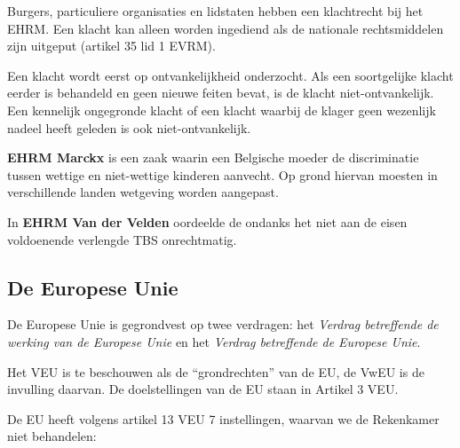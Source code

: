 \documentclass{article}
\begin{document}
Burgers, particuliere organisaties en lidstaten hebben een klachtrecht bij het
EHRM. Een klacht kan alleen worden ingediend als de nationale rechtsmiddelen
zijn uitgeput (artikel 35 lid 1 EVRM).

Een klacht wordt eerst op ontvankelijkheid onderzocht. Als een soortgelijke
klacht eerder is behandeld en geen nieuwe feiten bevat, is de klacht
niet-ontvankelijk. Een kennelijk ongegronde klacht of een klacht waarbij de
klager geen wezenlijk nadeel heeft geleden is ook niet-ontvankelijk.

\textbf{EHRM Marckx} is een zaak waarin een Belgische moeder de discriminatie
tussen wettige en niet-wettige kinderen aanvecht. Op grond hiervan moesten in
verschillende landen wetgeving worden aangepast.

In \textbf{EHRM Van der Velden} oordeelde de ondanks het niet aan de eisen
voldoenende verlengde TBS onrechtmatig.

\subsection{De Europese Unie}

De Europese Unie is gegrondvest op twee verdragen: het \emph{Verdrag
betreffende de werking van de Europese Unie} en het \emph{Verdrag betreffende
de Europese Unie}.

Het VEU is te beschouwen als de ``grondrechten'' van de EU, de VwEU is de
invulling daarvan. De doelstellingen van de EU staan in Artikel 3 VEU.

De EU heeft volgens artikel 13 VEU 7 instellingen, waarvan we de Rekenkamer
niet behandelen:
\end{document}
